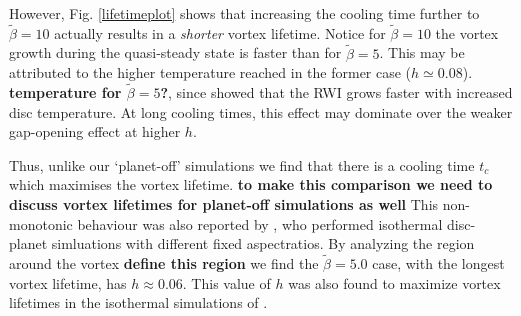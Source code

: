 However, Fig. \ref{lifetimeplot} shows that increasing the cooling
time further to $\tilde{\beta}=10$ actually results in a
\emph{shorter} vortex lifetime. Notice for $\tilde{\beta}=10$ the vortex growth 
during the quasi-steady state is faster than for
$\tilde{\beta}=5$. This may be attributed to the higher temperature
reached in the former case ($h\simeq 0.08$). {\bf temperature for
  $\tilde{\beta}=5$?}, since \cite{li00} showed that the RWI grows
faster with increased disc temperature. At long cooling times, this
effect may dominate over the weaker gap-opening effect at higher $h$.   


Thus, unlike our `planet-off' simulations we find that there is
a cooling time $t_c$ which maximises the vortex lifetime. {\bf to make
this comparison we need to discuss vortex lifetimes for planet-off
simulations as well} 
This
non-monotonic behaviour was also reported by \cite{fu14}, who
performed isothermal disc-planet simluations with different fixed
aspectratios.   
By analyzing the region
around the vortex {\bf define this region} we find the
$\tilde\beta=5.0$ case, with the longest vortex lifetime, has
$h\approx0.06$. This value of $h$ was also found to maximize vortex
lifetimes in the isothermal simulations of \cite{fu14}. 










